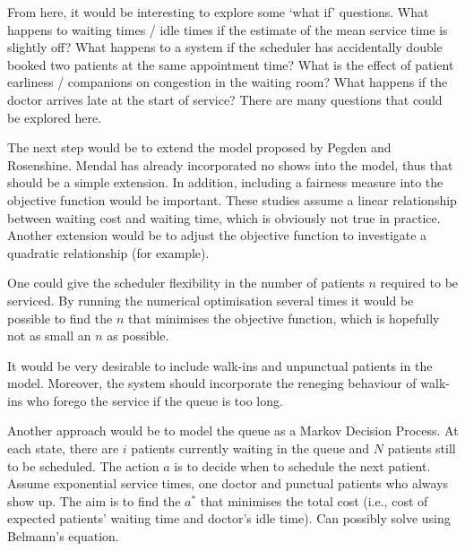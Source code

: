 \documentclass{article}
\begin{document}
From here, it would be interesting to explore some `what if' questions. What happens to waiting times / idle times if the estimate of the mean service time is slightly off? What happens to a system if the scheduler has accidentally double booked two patients at the same appointment time? What is the effect of patient earliness / companions on congestion in the waiting room? What happens if the doctor arrives late at the start of service? There are many questions that could be explored here.

The next step would be to extend the model proposed by Pegden and Rosenshine. Mendal has already incorporated no shows into the model, thus that should be a simple extension. In addition, including a fairness measure into the objective function would be important. These studies assume a linear relationship between waiting cost and waiting time, which is obviously not true in practice. Another extension would be to adjust the objective function to investigate a quadratic relationship (for example).

One could give the scheduler flexibility in the number of patients $n$ required to be serviced. By running the numerical optimisation several times it would be possible to find the $n$ that minimises the objective function, which is hopefully not as small an $n$ as possible.

It would be very desirable to include walk-ins and unpunctual patients in the model. Moreover, the system should incorporate the reneging behaviour of walk-ins who forego the service if the queue is too long.

Another approach would be to model the queue as a Markov Decision Process. At each state, there are $i$ patients currently waiting in the queue and $N$ patients still to be scheduled. The action $a$ is to decide when to schedule the next patient. Assume exponential service times, one doctor and punctual patients who always show up. The aim is to find the $a^{*}$ that minimises the total cost (i.e., cost of expected patients' waiting time and doctor's idle time). Can possibly solve using Belmann's equation.

\printbibliography
\end{document}
